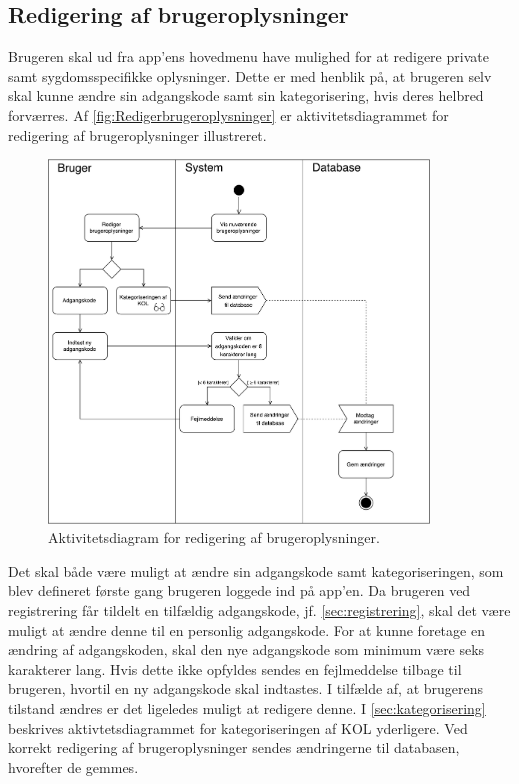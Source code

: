 \subsection{Redigering af brugeroplysninger}
Brugeren skal ud fra app'ens hovedmenu have mulighed for at redigere private samt sygdomsspecifikke oplysninger. Dette er med henblik på, at brugeren selv skal kunne ændre sin adgangskode samt sin kategorisering, hvis deres helbred forværres. Af \autoref{fig:Redigerbrugeroplysninger} er aktivitetsdiagrammet for redigering af brugeroplysninger illustreret. 

\begin{figure} [H]
\centering
\includegraphics[width=0.9\textwidth]{figures/aktivitetsdiagram/Redigerbrugeroplysninger}
\caption{Aktivitetsdiagram for redigering af brugeroplysninger.}
\label{fig:Redigerbrugeroplysninger}
\end{figure}

Det skal både være muligt at ændre sin adgangskode samt kategoriseringen, som blev defineret første gang brugeren loggede ind på app'en. Da brugeren ved registrering får tildelt en tilfældig adgangskode, jf. \autoref{sec:registrering}, skal det være muligt at ændre denne til en personlig adgangskode. For at kunne foretage en ændring af adgangskoden, skal den nye adgangskode som minimum være seks karakterer lang. Hvis dette ikke opfyldes sendes en fejlmeddelse tilbage til brugeren, hvortil en ny adgangskode skal indtastes. 
I tilfælde af, at brugerens tilstand ændres er det ligeledes muligt at redigere denne. I \autoref{sec:kategorisering} beskrives aktivtetsdiagrammet for kategoriseringen af KOL yderligere. 
Ved korrekt redigering af brugeroplysninger sendes ændringerne til databasen, hvorefter de gemmes.